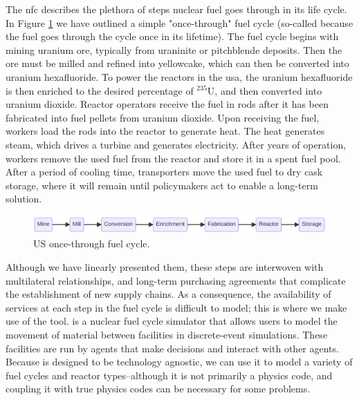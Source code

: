 The \gls{nfc} describes the plethora of steps nuclear fuel goes through
in its life cycle. In Figure \ref{fig:once-through} we have outlined a
simple "once-through" fuel cycle (so-called because the fuel goes through
the cycle once in its lifetime). The fuel cycle begins with mining uranium ore,
typically from uraninite or pitchblende deposits. Then the ore must be milled
and refined into yellowcake, which can then be converted into uranium
hexafluoride. To power the reactors in the \gls{usa}, the uranium hexafluoride
is then enriched to the desired percentage of $^{235}$U, and then converted
into uranium dioxide. Reactor operators receive the fuel in rods after it has
been fabricated into fuel pellets from uranium dioxide. Upon receiving the
fuel, workers load the rods into the reactor to generate heat. The heat
generates steam, which drives a turbine and generates electricity. After years
of operation, workers remove the used fuel from the reactor and store it in a
spent fuel pool. After a period of cooling time, transporters move the used
fuel to dry cask storage, where it will remain until policymakers act to enable
a long-term solution.

\begin{figure}[H]
    \centering
    \includegraphics[scale=0.40]{images/once_through_fc.png}
    \caption{US once-through fuel cycle.}
    \label{fig:once-through}
\end{figure}

Although we have linearly presented them, these steps are interwoven with
multilateral relationships, and long-term purchasing agreements that complicate
the establishment of new supply chains. As a consequence, the availability of
services at each step in the fuel cycle is difficult to model; this is where we
make use of the \cyclus \cite{huff_cyclus_intro_2016} tool. \cyclus is a
nuclear fuel cycle simulator that allows users to model the movement of
material between facilities in discrete-event simulations. These facilities
are run by agents that make decisions and interact with other agents. Because
\cyclus is designed to be technology agnostic, we can use it to model a variety
of fuel cycles and reactor types--although it is not primarily a physics code,
and coupling it with true physics codes can be necessary for some problems.

